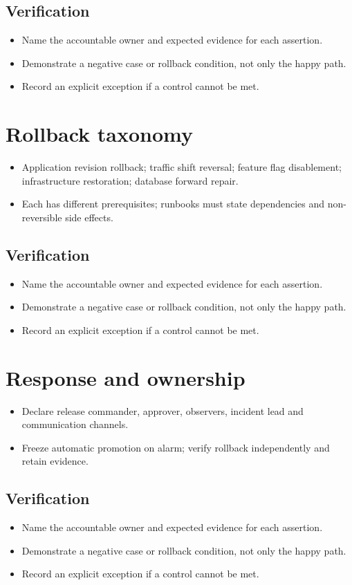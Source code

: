 \documentclass[10pt,letterpaper]{article}
\begin{document}
\subsection{Verification}
\begin{itemize}
\item Name the accountable owner and expected evidence for each assertion.
\item Demonstrate a negative case or rollback condition, not only the happy path.
\item Record an explicit exception if a control cannot be met.
\end{itemize}


\section{Rollback taxonomy}
\begin{itemize}
\item Application revision rollback; traffic shift reversal; feature flag disablement; infrastructure restoration; database forward repair.
\item Each has different prerequisites; runbooks must state dependencies and non-reversible side effects.
\end{itemize}
\subsection{Verification}
\begin{itemize}
\item Name the accountable owner and expected evidence for each assertion.
\item Demonstrate a negative case or rollback condition, not only the happy path.
\item Record an explicit exception if a control cannot be met.
\end{itemize}


\section{Response and ownership}
\begin{itemize}
\item Declare release commander, approver, observers, incident lead and communication channels.
\item Freeze automatic promotion on alarm; verify rollback independently and retain evidence.
\end{itemize}
\subsection{Verification}
\begin{itemize}
\item Name the accountable owner and expected evidence for each assertion.
\item Demonstrate a negative case or rollback condition, not only the happy path.
\item Record an explicit exception if a control cannot be met.
\end{itemize}
\end{document}
